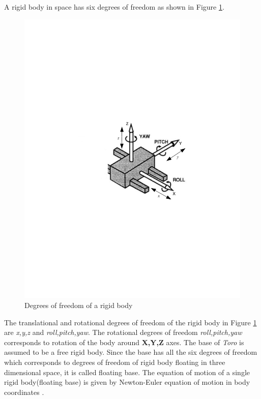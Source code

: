 A rigid body in space has six degrees of freedom as shown in Figure \ref{fig:rbody}.
\begin{figure}[H]
\begin{center}
\includegraphics[trim= 30mm 100mm 10mm 120mm,scale=0.75]{Bilder/rbody_dof.pdf}
\caption[Degrees of freedom of a rigid body]{Degrees of freedom of a rigid body \footnotemark[1]}
\label{fig:rbody}
\end{center}
\end{figure}
The translational and rotational degrees of freedom of the rigid body in Figure \ref{fig:rbody} are \emph{x,y,z} and \emph{roll,pitch,yaw}. The rotational degrees of freedom \emph{roll,pitch,yaw} corresponds to rotation of the body around \textbf{X,Y,Z} axes. The base of \emph{Toro} is assumed to be a free rigid body. Since the base has all the six degrees of freedom which corresponds to degrees of freedom of rigid body floating in three dimensional space, it is called floating base. The equation of motion of a single rigid body(floating base) is given by Newton-Euler equation of motion in body coordinates \cite[Chapter 4]{mur94}. 
